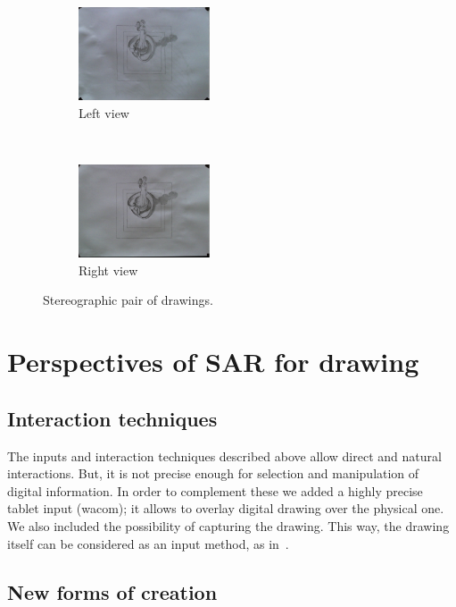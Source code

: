 \documentclass{article}
\begin{document}
\begin{figure}[!h]
        \begin{subfigure}[b]{0.23\textwidth}
                \centering
                \includegraphics[width=3.9cm]{stereo1}
                \caption{Left view}
                \label{fig:stereo1}
        \end{subfigure}
        ~ %
        \begin{subfigure}[b]{0.23\textwidth}
                \centering
                \includegraphics[width=3.9cm]{stereo2}
                \caption{Right view}
                \label{fig:stereo2}
        \end{subfigure}
        \caption{Stereographic pair of drawings.}\label{fig:stereo}
\end{figure}

\section{Perspectives of SAR for drawing}

\subsection*{Interaction techniques}

The inputs and interaction techniques described above allow direct and natural interactions. But, it is not precise enough for selection and manipulation of digital information. In order to complement 
these we added a highly precise tablet input (wacom); it allows to overlay digital drawing over the physical one. We also included the possibility of capturing the drawing. This way, the drawing itself can be considered as an input method, as in~\cite{hagbi2009shape}. 

\subsection*{New forms of creation}
\end{document}
